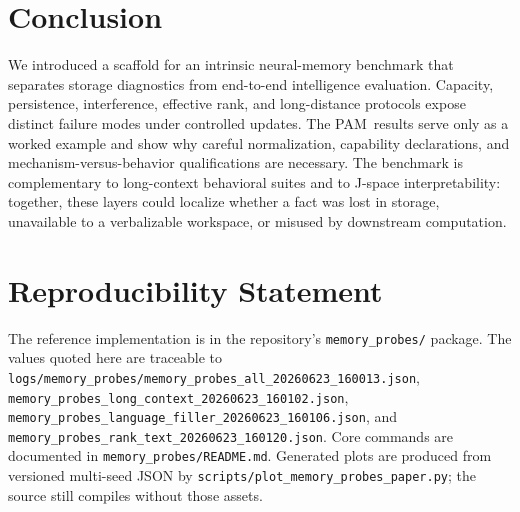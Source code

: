 \documentclass[10pt,twocolumn]{article}
\newcommand{\pam}{\textsc{PAM}}
\begin{document}
\section{Conclusion}

We introduced a scaffold for an intrinsic neural-memory benchmark that
separates storage diagnostics from end-to-end intelligence evaluation.
Capacity, persistence, interference, effective rank, and long-distance
protocols expose distinct failure modes under controlled updates.  The \pam\
results serve only as a worked example and show why careful normalization,
capability declarations, and mechanism-versus-behavior qualifications are
necessary.  The benchmark is complementary to long-context behavioral suites
and to J-space interpretability: together, these layers could localize whether
a fact was lost in storage, unavailable to a verbalizable workspace, or
misused by downstream computation.

\section*{Reproducibility Statement}

The reference implementation is in the repository's
\texttt{memory\_probes/} package.  The values quoted here are traceable to
\texttt{logs/memory\_probes/memory\_probes\_all\_20260623\_160013.json},
\texttt{memory\_probes\_long\_context\_20260623\_160102.json},
\texttt{memory\_probes\_language\_filler\_20260623\_160106.json}, and
\texttt{memory\_probes\_rank\_text\_20260623\_160120.json}.  Core commands are
documented in \texttt{memory\_probes/README.md}.  Generated plots are
produced from versioned multi-seed JSON by
\texttt{scripts/plot\_memory\_probes\_paper.py}; the source still compiles
without those assets.



\end{document}
